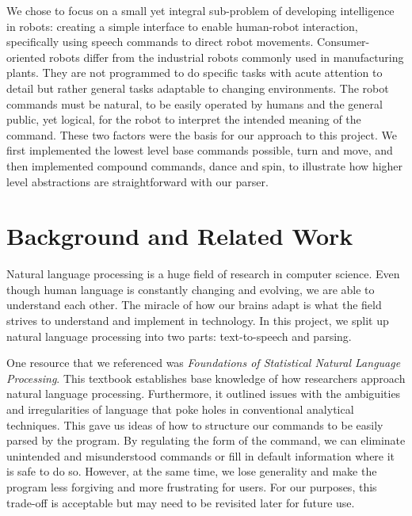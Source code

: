 \documentclass{article}
\begin{document}
\vspace{5mm}

\noindent We chose to focus on a small yet integral sub-problem of developing intelligence in robots: creating a simple interface to enable human-robot interaction, specifically using speech commands to direct robot movements. Consumer-oriented robots differ from the industrial robots commonly used in manufacturing plants. They are not programmed to do specific tasks with acute attention to detail but rather general tasks adaptable to changing environments. The robot commands must be natural, to be easily operated by humans and the general public, yet logical, for the robot to interpret the intended meaning of the command. These two factors were the basis for our approach to this project.  We first implemented the lowest level base commands possible, turn and move, and then implemented compound commands, dance and spin, to illustrate how higher level abstractions are straightforward with our parser.

\section{Background and Related Work}
Natural language processing is a huge field of research in computer science. Even though human language is constantly changing and evolving, we are able to understand each other. The miracle of how our brains adapt is what the field strives to understand and implement in technology. In this project, we split up natural language processing into two parts: text-to-speech and parsing.\par

\vspace{5mm}

\noindent One resource that we referenced was \textit{Foundations of Statistical Natural Language Processing}. This textbook establishes base knowledge of how researchers approach natural language processing. Furthermore, it outlined issues with the ambiguities and irregularities of language that poke holes in conventional analytical techniques. This gave us ideas of how to structure our commands to be easily parsed by the program. By regulating the form of the command, we can eliminate unintended and misunderstood commands or fill in default information where it is safe to do so. However, at the same time, we lose generality and make the program less forgiving and more frustrating for users. For our purposes, this trade-off is acceptable but may need to be revisited later for future use.\par
\end{document}
